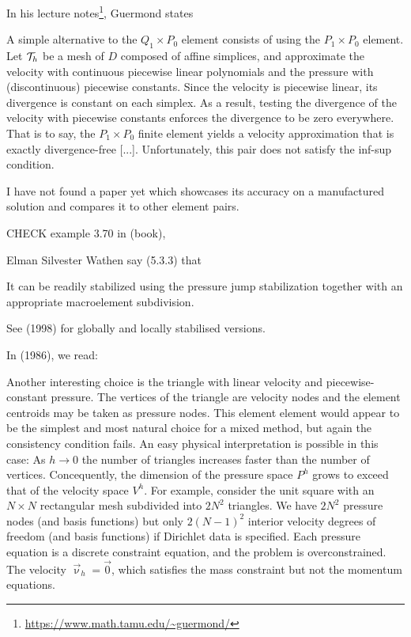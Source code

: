 
In his lecture notes\footnote{\url{https://www.math.tamu.edu/~guermond/}}, 
Guermond states 
\begin{displayquote}
{\color{darkgray}
A simple alternative to the 
$Q_1\times P_0$ element consists of using the $P_1\times P_0$ element.
Let ${\cal T}_h$  be a mesh of $D$ composed of affine simplices, and approximate the 
velocity with continuous piecewise linear polynomials and the pressure with
(discontinuous) piecewise constants. Since the velocity is piecewise linear, its
divergence is constant on each simplex. As a result, testing the divergence
of the velocity with piecewise constants enforces the divergence to be zero
everywhere. That is to say, the $P_1\times P_0$ finite element yields a velocity 
approximation that is exactly divergence-free [...]. Unfortunately,
this pair does not satisfy the inf-sup condition.}
\end{displayquote}

I have not found a paper yet which showcases its accuracy on a manufactured solution
and compares it to other element pairs.

CHECK example 3.70 in \textcite{john16} (book),

Elman Silvester Wathen say (5.3.3) that 
\begin{displayquote}
{\color{darkgray}
It can be readily stabilized using the pressure jump
stabilization together with an appropriate macroelement subdivision.}
\end{displayquote}
See \textcite{nosi98} (1998) for globally and locally stabilised versions.

In \textcite{caod86} (1986), we read:
\begin{displayquote}
{\color{darkgray}
Another interesting choice is the triangle with linear velocity and 
piecewise-constant pressure.
The vertices of the triangle are velocity nodes
and the element centroids may be taken as pressure nodes.
This element element would appear to be the simplest and most natural choice
for a mixed method, but again the consistency condition fails.
An easy physical interpretation is possible in this case:
As $h\rightarrow 0$ the number of triangles increases faster than the number
of vertices. Concequently, the dimension of the pressure space $P^h$
grows to exceed that of the velocity space $V^h$.
For example, consider the unit square with an $N\times N$ rectangular mesh
subdivided into $2N^2$ triangles. We have $2N^2$ pressure nodes
(and basis functions) but only $2(N-1)^2$ interior velocity degrees of freedom
(and basis functions) if Dirichlet data is specified. 
Each pressure equation is a discrete constraint equation, and the 
problem is overconstrained. The velocity $\vec{\upnu}_h=\vec{0}$, which 
satisfies the mass constraint but not the momentum equations.
}
\end{displayquote}
 

 
